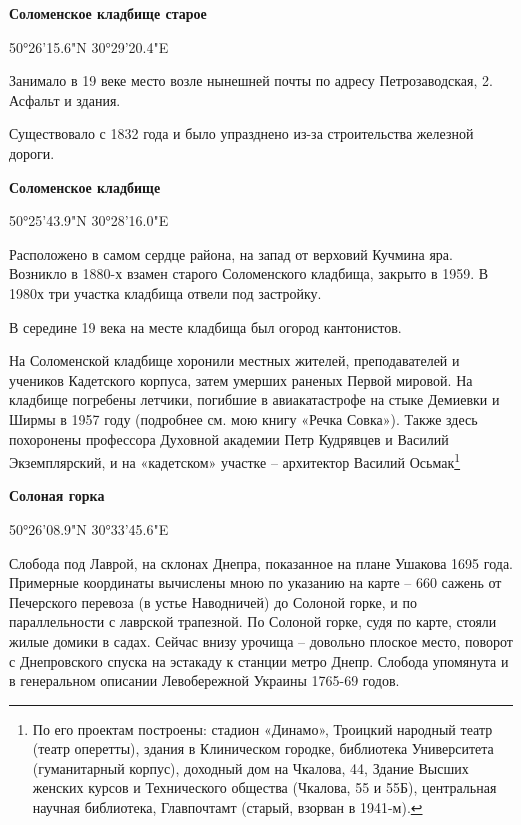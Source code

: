\textbf{Соломенское кладбище старое}

50°26'15.6"N 30°29'20.4"E

Занимало в 19 веке место возле нынешней почты по адресу Петрозаводская, 2. Асфальт и здания.

Существовало с 1832 года и было упразднено из-за строительства железной дороги.
\\

\medskip

\textbf{Соломенское кладбище}

50°25'43.9"N 30°28'16.0"E

Расположено в самом сердце района, на запад от верховий Кучмина яра. Возникло в 1880-х взамен старого Соломенского кладбища, закрыто в 1959. В 1980х три участка кладбища отвели под застройку.

В середине 19 века на месте кладбища был огород кантонистов.

На Соломенской кладбище хоронили местных жителей, преподавателей и учеников Кадетского корпуса, затем умерших раненых Первой мировой. На кладбище погребены летчики, погибшие в авиакатастрофе на стыке Демиевки и Ширмы в 1957 году (подробнее см. мою книгу «Речка Совка»). Также здесь похоронены профессора Духовной академии Петр Кудрявцев и Василий Экземплярский, и на «кадетском» участке – архитектор Василий Осьмак\footnote{По его проектам построены: стадион «Динамо», Троицкий народный театр (театр оперетты), здания в Клиническом городке, библиотека Университета (гуманитарный корпус), доходный дом на Чкалова, 44, Здание Высших женских курсов и Технического общества (Чкалова, 55 и 55Б), центральная научная библиотека, Главпочтамт (старый, взорван в 1941-м).}\\

\medskip

\textbf{Солоная горка} 

50°26'08.9"N 30°33'45.6"E

Слобода под Лаврой, на склонах Днепра, показанное на плане Ушакова 1695 года. Примерные координаты вычислены мною по указанию на карте – 660 сажень от Печерского перевоза (в устье Наводничей) до Солоной горке, и по параллельности с лаврской трапезной. По Солоной горке, судя по карте, стояли жилые домики в садах. Сейчас внизу урочища – довольно плоское место, поворот с Днепровского спуска на эстакаду к станции метро Днепр. Слобода упомянута и в генеральном описании Левобережной Украины 1765-69 годов.\\

\medskip

